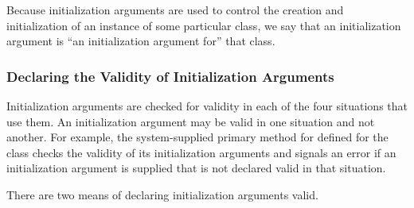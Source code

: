 Because initialization arguments are used to control the creation and
initialization of an instance of some particular class, we say that an
initialization argument is ``an initialization argument for'' that
class.


\subsubsection{Declaring the Validity of Initialization Arguments}
\label{Declaring-the-Validity-of-Initialization-Arguments-SECTION}

Initialization arguments are checked for validity in each of the four
situations that use them.  An initialization argument may be valid in
one situation and not another. For example, the system-supplied
primary method for  defined for the class 
 checks the validity of its initialization arguments
and signals an error if an initialization argument is supplied that is
not declared valid in that situation.


There are two means of declaring initialization arguments valid.

